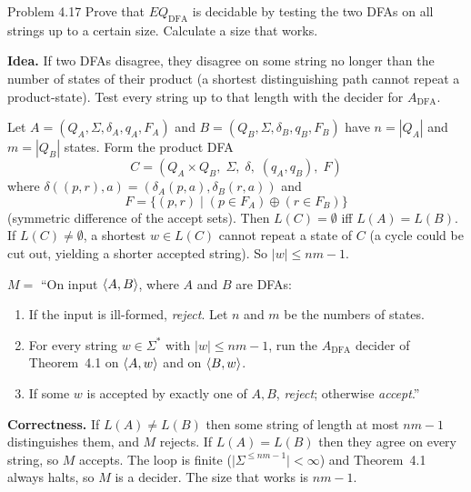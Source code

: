\begin{question}{Problem 4.17}
Prove that $\mathit{EQ}_{\mathrm{DFA}}$ is decidable by testing the two DFAs on all strings up to a certain size. Calculate a size that works.
\end{question}
\begin{soln}
\textbf{Idea.} If two DFAs disagree, they disagree on some string no longer than the number of states of their product (a shortest distinguishing path cannot repeat a product-state). Test every string up to that length with the decider for $A_{\mathrm{DFA}}$.

Let $A=(Q_A,\Sigma,\delta_A,q_A,F_A)$ and $B=(Q_B,\Sigma,\delta_B,q_B,F_B)$ have $n=|Q_A|$ and $m=|Q_B|$ states. Form the product DFA
\[
C=(Q_A\times Q_B,\;\Sigma,\;\delta,\;(q_A,q_B),\;F)
\]
where $\delta((p,r),a)=(\delta_A(p,a),\delta_B(r,a))$ and
\[
F=\bigl\{(p,r)\mid (p\in F_A)\oplus(r\in F_B)\bigr\}
\]
(symmetric difference of the accept sets). Then $L(C)=\emptyset$ iff $L(A)=L(B)$. If $L(C)\neq\emptyset$, a shortest $w\in L(C)$ cannot repeat a state of $C$ (a cycle could be cut out, yielding a shorter accepted string). So $|w|\le nm-1$.

$M=$ ``On input $\langle A,B\rangle$, where $A$ and $B$ are DFAs:
\begin{enumerate}
\item If the input is ill-formed, \emph{reject}. Let $n$ and $m$ be the numbers of states.
\item For every string $w\in\Sigma^*$ with $|w|\le nm-1$, run the $A_{\mathrm{DFA}}$ decider of Theorem~4.1 on $\langle A,w\rangle$ and on $\langle B,w\rangle$.
\item If some $w$ is accepted by exactly one of $A,B$, \emph{reject}; otherwise \emph{accept}.''
\end{enumerate}

\textbf{Correctness.} If $L(A)\neq L(B)$ then some string of length at most $nm-1$ distinguishes them, and $M$ rejects. If $L(A)=L(B)$ then they agree on every string, so $M$ accepts. The loop is finite ($\lvert\Sigma^{\le nm-1}\rvert<\infty$) and Theorem~4.1 always halts, so $M$ is a decider. The size that works is $nm-1$.
\end{soln}

